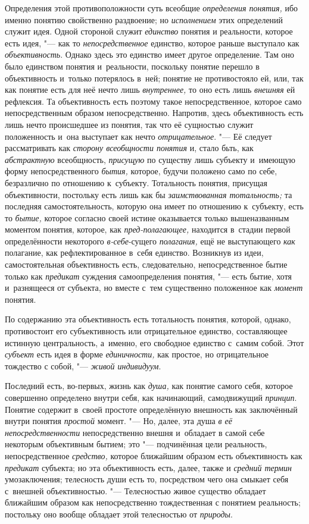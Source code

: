 Определения этой противоположности суть всеобщие {\em определения понятия,}
ибо именно понятию свойственно раздвоение; но {\em исполнением} этих
определений служит идея. Одной стороной служит {\em единство} понятия и
реальности, которое есть идея, "--- как то {\em непосредственное}
единство, которое раньше выступало как {\em объективность}.
Однако здесь это единство имеет другое определение. Там оно
было единством понятия и~реальности, поскольку понятие перешло в
объективность и~только потерялось в~ней; понятие не противостояло ей, или,
так как понятие есть для неё нечто лишь
{\em внутреннее,} то оно есть лишь {\em внешняя}
ей рефлексия. Та объективность есть поэтому такое
непосредственное, которое само непосредственным образом непосредственно.
Напротив, здесь объективность есть лишь нечто происшедшее из понятия, так
что её сущностью служит положенность и~она выступает как нечто
{\em отрицательное}. "--- Её следует рассматривать как {\em сторону
всеобщности понятия} и, стало бьть, как {\em абстрактную}
всеобщность, {\em присущую} по
существу лишь субъекту и~имеющую форму непосредственного {\em бытия,} которое,
будучи положено само по себе, безразлично по отношению к~субъекту.
Тотальность понятия, присущая объективности, постольку есть лишь как бы
{\em заимствованная тотальность;}
та последняя самостоятельность, которую она
имеет по отношению к~субъекту, есть то {\em бытие,} которое
согласно своей истине оказывается только вышеназванным моментом понятия,
которое, как {\em пред-полагающее,}
находится в~стадии первой определённости некоторого
{\em в-себе}-сущего {\em полагания,} ещё не выступающего {\em как}
полагание, как рефлектированное в~себя единство. Возникнув
из идеи, самостоятельная объективность есть, следовательно,
непосредственное бытие только как {\em предикат} суждения
самоопределения понятия, "--- есть бытие, хотя и~разнящееся от
субъекта, но вместе с~тем существенно положенное как {\em момент} понятия.

По содержанию эта объективность есть тотальность понятия,
которой, однако, противостоит его субъективность или отрицательное
единство, составляющее истинную центральность, а~именно, его свободное
единство с~самим собой. Этот {\em субъект} есть идея в
форме {\em единичности,} как простое, но отрицательное тождество
с собой, "--- {\em живой индивидуум}.

Последний есть, во-первых, жизнь как {\em душа,} как понятие
самого себя, которое совершенно определено внутри себя, как начинающий,
самодвижущий {\em принцип}.
Понятие содержит в~своей простоте определённую внешность как
заключённый внутри понятия
{\em простой} момент. "---
Но, далее, эта душа {\em в
её непосредственности} непосредственно внешня и~обладает в
самой себе некоторым объективным бытием; это "--- подчинённая
цели реальность, непосредственное
{\em средство,} которое
ближайшим образом есть объективность как
{\em предикат} субъекта;
но эта объективность есть, далее, также и
{\em средний термин}
умозаключения; телесность души есть то, посредством чего она
смыкает себя с~внешней объективностью. "--- Телесностью живое
существо обладает ближайшим образом как непосредственно тождественная с
понятием реальность; постольку оно вообще обладает этой телесностью от
{\em природы}.


